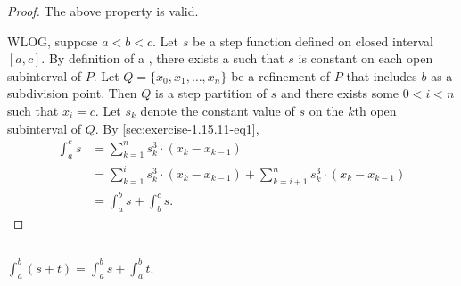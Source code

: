\documentclass{report}
\begin{document}
\begin{proof}

  The above property is valid.

  \divider

  WLOG, suppose $a < b < c$.
  Let $s$ be a step function defined on closed interval $[a, c]$.
  By definition of a , there exists a
     such that $s$ is constant on each open
    subinterval of $P$.
  Let $Q = \{x_0, x_1, \ldots, x_n\}$ be a refinement of $P$ that includes $b$
    as a subdivision point.
  Then $Q$ is a step partition of $s$ and there exists some $0 < i < n$ such
    that $x_i = c$.
  Let $s_k$ denote the constant value of $s$ on the $k$th open subinterval of
    $Q$.
  By \eqref{sec:exercise-1.15.11-eq1},
    \begin{align*}
      \int_a^c s
        & = \sum_{k=1}^n s_k^3 \cdot (x_k - x_{k-1}) \\
        & = \sum_{k=1}^i s_k^3 \cdot (x_k - x_{k-1}) +
            \sum_{k=i+1}^n s_k^3 \cdot (x_k - x_{k-1}) \\
        & = \int_a^b s + \int_b^c s.
    \end{align*}

\end{proof}

\subsection{}%
\label{sub:exercise-1.15.11b}

$\int_a^b (s + t) = \int_a^b s + \int_a^b t$.

\end{document}
